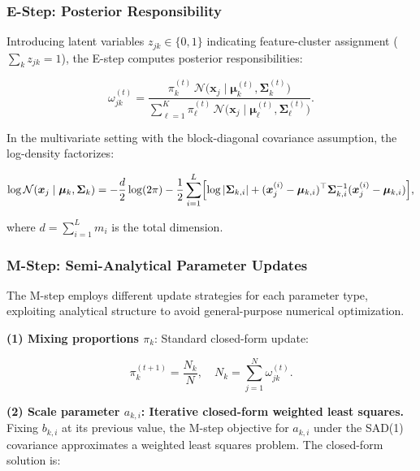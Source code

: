 \documentclass[12pt,a4paper]{article}
\begin{document}
\subsubsection{E-Step: Posterior Responsibility}

Introducing latent variables $z_{jk} \in \{0, 1\}$ indicating feature-cluster assignment ($\sum_k z_{jk} = 1$), the E-step computes posterior responsibilities:

\begin{equation}\label{eq:resp}
    \omega_{jk}^{(t)} = \frac{\pi_k^{(t)} \,
        \mathcal{N}\bigl(\bm{x}_j \mid \bm{\mu}_k^{(t)}, \bm{\Sigma}_k^{(t)}\bigr)}
        {\sum_{\ell=1}^{K} \pi_\ell^{(t)} \,
        \mathcal{N}\bigl(\bm{x}_j \mid \bm{\mu}_\ell^{(t)}, \bm{\Sigma}_\ell^{(t)}\bigr)}.
\end{equation}

In the multivariate setting with the block-diagonal covariance assumption, the log-density factorizes:

\begin{equation}\label{eq:log_prob}
    \log \mathcal{N}(\bm{x}_j \mid \bm{\mu}_k, \bm{\Sigma}_k) =
    -\frac{d}{2}\log(2\pi) - \frac{1}{2} \sum_{i=1}^{L}
    \Bigl[ \log|\bm{\Sigma}_{k,i}| + (\bm{x}_j^{(i)} - \bm{\mu}_{k,i})^\top \bm{\Sigma}_{k,i}^{-1} (\bm{x}_j^{(i)} - \bm{\mu}_{k,i}) \Bigr],
\end{equation}

where $d = \sum_{i=1}^{L} m_i$ is the total dimension.

\subsubsection{M-Step: Semi-Analytical Parameter Updates}

The M-step employs different update strategies for each parameter type, exploiting analytical structure to avoid general-purpose numerical optimization.

\textbf{(1) Mixing proportions $\pi_k$}: Standard closed-form update:

\begin{equation}\label{eq:pi_update}
    \pi_k^{(t+1)} = \frac{N_k}{N}, \quad N_k = \sum_{j=1}^{N} \omega_{jk}^{(t)}.
\end{equation}

\textbf{(2) Scale parameter $a_{k,i}$: Iterative closed-form weighted least squares.} Fixing $b_{k,i}$ at its previous value, the M-step objective for $a_{k,i}$ under the SAD(1) covariance approximates a weighted least squares problem. The closed-form solution is:
\end{document}
